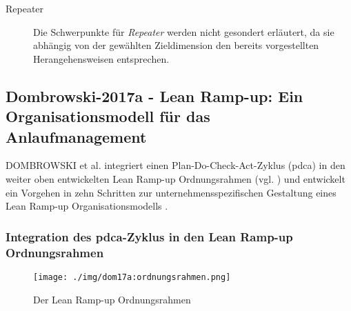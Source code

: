 \begin{description}
\item[Repeater] Die Schwerpunkte für \textit{Repeater} werden nicht gesondert erläutert, da sie abhängig von der gewählten Zieldimension den bereits vorgestellten Herangehensweisen entsprechen. 
\end{description}

\subsection*{Dombrowski-2017a - Lean Ramp-up: Ein Organisationsmodell für das Anlaufmanagement}

DOMBROWSKI et al. integriert einen Plan-Do-Check-Act-Zyklus (\gls{pdca}) in den weiter oben entwickelten Lean Ramp-up Ordnungsrahmen (vgl. \cite{Dombrowski2009}) und entwickelt ein Vorgehen in zehn Schritten zur unternehmensspezifischen Gestaltung eines Lean Ramp-up Organisationsmodells \autocite{Dombrowski2017a}. 

\subsubsection{Integration des \gls{pdca}-Zyklus in den Lean Ramp-up Ordnungsrahmen}
\begin{figure}[h]
 \centering
 \texttt{[image: ./img/dom17a:ordnungsrahmen.png]}
 \caption[Der Lean Ramp-up Ordnungsrahmen]{Der Lean Ramp-up Ordnungsrahmen \autocite{Dombrowski2017a}}
 \label{fig:dom17a:ordnungsrahmen}
\end{figure}

